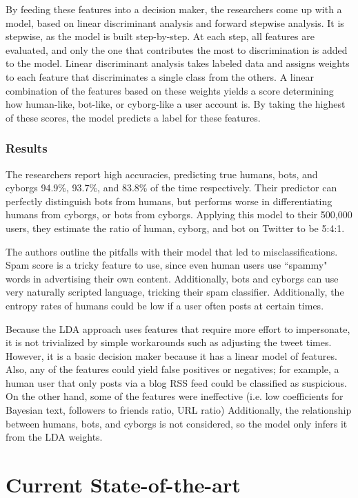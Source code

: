 \documentclass[11pt, oneside]{article}   	%
\begin{document}
\quad By feeding these features into a decision maker, the researchers come up with a model, based on linear discriminant analysis and forward stepwise analysis.
It is stepwise, as the model is built step-by-step.
At each step, all features are evaluated, and only the one that contributes the most to discrimination is added to the model.
Linear discriminant analysis takes labeled data and assigns weights to each feature that discriminates a single class from the others.
A linear combination of the features based on these weights yields a score determining how human-like, bot-like, or cyborg-like a user account is.
By taking the highest of these scores, the model predicts a label for these features.

\subsubsection*{Results}

\quad The researchers report high accuracies, predicting true humans, bots, and cyborgs 94.9\%, 93.7\%, and 83.8\% of the time respectively.
Their predictor can perfectly distinguish bots from humans, but performs worse in differentiating humans from cyborgs, or bots from cyborgs.
Applying this model to their 500,000 users, they estimate the ratio of human, cyborg, and bot on Twitter to be 5:4:1.

\quad The authors outline the pitfalls with their model that led to misclassifications.
Spam score is a tricky feature to use, since even human users use ``spammy" words in advertising their own content.
Additionally, bots and cyborgs can use very naturally scripted language, tricking their spam classifier.
Additionally, the entropy rates of humans could be low if a user often posts at certain times.

\quad Because the LDA approach uses features that require more effort to impersonate, it is not trivialized by simple workarounds such as adjusting the tweet times.
However, it is a basic decision maker because it has a linear model of features.
Also, any of the features could yield false positives or negatives; for example, a human user that only posts via a blog RSS feed could be classified as suspicious.
On the other hand, some of the features were ineffective (i.e. low coefficients for Bayesian text, followers to friends ratio, URL ratio)
Additionally, the relationship between humans, bots, and cyborgs is not considered, so the model only infers it from the LDA weights.

\section*{Current State-of-the-art}
\end{document}

